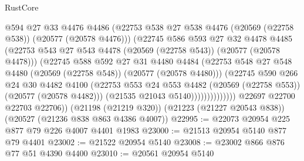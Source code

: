 \begin{lexlean}{RustCore}
\begin{coremodule}
                            @594
                            @27
                            @33
                            @4476
                            @4486
                            (@22753
                              @538
                              @27
                              @538
                              @4476
                              (@20569 (@22758 @538))
                              (@20577 (@20578 @4476)))
                            (@22745
                              @586
                              @593
                              @27
                              @32
                              @4478
                              @4485
                              (@22753
                                @543
                                @27
                                @543
                                @4478
                                (@20569 (@22758 @543))
                                (@20577 (@20578 @4478)))
                              (@22745
                                @588
                                @592
                                @27
                                @31
                                @4480
                                @4484
                                (@22753
                                  @548
                                  @27
                                  @548
                                  @4480
                                  (@20569 (@22758 @548))
                                  (@20577 (@20578 @4480)))
                                (@22745
                                  @590
                                  @266
                                  @24
                                  @30
                                  @4482
                                  @4100
                                  (@22753
                                    @553
                                    @24
                                    @553
                                    @4482
                                    (@20569 (@22758 @553))
                                    (@20577 (@20578 @4482)))
                                  (@21535 @21043 @5140))))))))))))))
        @22697
        @22700
        @22703
        @22706))
    (@21198 (@21219 @320))
    (@21223 (@21227 @20543 @838))
    (@20527 (@21236 @838 @863 @4386 @4007))
@22995 := @22073 @20954 @225 @877 @79 @226 @4007 @4401 @1983
@23000 := @21513 @20954 @5140 @877 @79 @4401
@23002 := @21522 @20954 @5140
@23008 := @23002 @866 @876 @77 @51 @4390 @4400
@23010 := @20561 @20954 @5140

\end{coremodule}
\end{lexlean}
